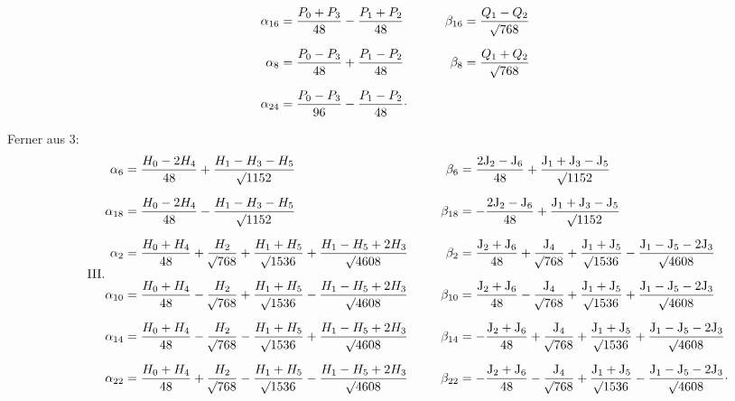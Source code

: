 \begin{landscape}
\[\begin{aligned}
\alpha_{16}&=\frac{P_0+P_3}{48}-\frac{P_1+P_2}{48}&\qquad\beta_{16}&=\frac{Q_1-Q_2}{\BareRoot{768}}\\[6pt]
\alpha_8&=\frac{P_0-P_3}{48}+\frac{P_1-P_2}{48}&\beta_8&=\frac{Q_1+Q_2}{\BareRoot{768}}\\[6pt]
\alpha_{24}&=\frac{P_0-P_3}{96}-\frac{P_1-P_2}{48}\VthreeRaisedPoint&&
\end{aligned}
\]
\par\noindent\hspace*{\parindent}Ferner aus 3:
\[
\tag*{III.}
\begin{aligned}
\alpha_6&=\frac{H_0-2H_4}{48}+\frac{H_1-H_3-H_5}{\BareRoot{1152}}&\qquad\beta_6&=\frac{2\mathrm{J}_2-\mathrm{J}_6}{48}+\frac{\mathrm{J}_1+\mathrm{J}_3-\mathrm{J}_5}{\BareRoot{1152}}\\[6pt]
\alpha_{18}&=\frac{H_0-2H_4}{48}-\frac{H_1-H_3-H_5}{\BareRoot{1152}}&\beta_{18}&=-\frac{2\mathrm{J}_2-\mathrm{J}_6}{48}+\frac{\mathrm{J}_1+\mathrm{J}_3-\mathrm{J}_5}{\BareRoot{1152}}\\[6pt]
\alpha_2&=\frac{H_0+H_4}{48}+\frac{H_2}{\BareRoot{768}}+\frac{H_1+H_5}{\BareRoot{1536}}+\frac{H_1-H_5+2H_3}{\BareRoot{4608}}&\beta_2&=\frac{\mathrm{J}_2+\mathrm{J}_6}{48}+\frac{\mathrm{J}_4}{\BareRoot{768}}+\frac{\mathrm{J}_1+\mathrm{J}_5}{\BareRoot{1536}}-\frac{\mathrm{J}_1-\mathrm{J}_5-2\mathrm{J}_3}{\BareRoot{4608}}\\[6pt]
\alpha_{10}&=\frac{H_0+H_4}{48}-\frac{H_2}{\BareRoot{768}}+\frac{H_1+H_5}{\BareRoot{1536}}-\frac{H_1-H_5+2H_3}{\BareRoot{4608}}&\beta_{10}&=\frac{\mathrm{J}_2+\mathrm{J}_6}{48}-\frac{\mathrm{J}_4}{\BareRoot{768}}+\frac{\mathrm{J}_1+\mathrm{J}_5}{\BareRoot{1536}}+\frac{\mathrm{J}_1-\mathrm{J}_5-2\mathrm{J}_3}{\BareRoot{4608}}\\[6pt]
\alpha_{14}&=\frac{H_0+H_4}{48}-\frac{H_2}{\BareRoot{768}}-\frac{H_1+H_5}{\BareRoot{1536}}+\frac{H_1-H_5+2H_3}{\BareRoot{4608}}&\beta_{14}&=-\frac{\mathrm{J}_2+\mathrm{J}_6}{48}+\frac{\mathrm{J}_4}{\BareRoot{768}}+\frac{\mathrm{J}_1+\mathrm{J}_5}{\BareRoot{1536}}+\frac{\mathrm{J}_1-\mathrm{J}_5-2\mathrm{J}_3}{\BareRoot{4608}}\\[6pt]
\alpha_{22}&=\frac{H_0+H_4}{48}+\frac{H_2}{\BareRoot{768}}-\frac{H_1+H_5}{\BareRoot{1536}}-\frac{H_1-H_5+2H_3}{\BareRoot{4608}}&\beta_{22}&=-\frac{\mathrm{J}_2+\mathrm{J}_6}{48}-\frac{\mathrm{J}_4}{\BareRoot{768}}+\frac{\mathrm{J}_1+\mathrm{J}_5}{\BareRoot{1536}}-\frac{\mathrm{J}_1-\mathrm{J}_5-2\mathrm{J}_3}{\BareRoot{4608}}\VthreeRaisedPoint
\end{aligned}
\]
\clearpage
\endgroup
\end{landscape}
